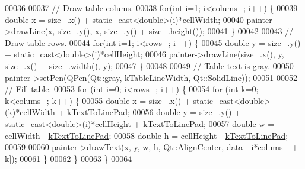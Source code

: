 \begin{DoxyCode}
00036 
00037   \textcolor{comment}{// Draw table colums.}
00038   \textcolor{keywordflow}{for}(\textcolor{keywordtype}{int} i=1; i<colums\_; i++) \{
00039     \textcolor{keywordtype}{double} x = size\_.x() + \textcolor{keyword}{static\_cast<}\textcolor{keywordtype}{double}\textcolor{keyword}{>}(i)*cellWidth;
00040     painter->drawLine(x, size\_.y(), x, size\_.y() + size\_.height());
00041   \}
00042 
00043   \textcolor{comment}{// Draw table rows.}
00044   \textcolor{keywordflow}{for}(\textcolor{keywordtype}{int} i=1; i<rows\_; i++) \{
00045     \textcolor{keywordtype}{double} y = size\_.y() + \textcolor{keyword}{static\_cast<}\textcolor{keywordtype}{double}\textcolor{keyword}{>}(i)*cellHeight;
00046     painter->drawLine(size\_.x(), y, size\_.x() + size\_.width(), y);
00047   \}
00048 
00049   \textcolor{comment}{// Table text is gray.}
00050   painter->setPen(QPen(Qt::gray, \hyperlink{class_data_table_aa4aed4c624ca9a8e68c9ecc4d2b43458}{kTableLineWidth}, Qt::SolidLine));
00051 
00052   \textcolor{comment}{// Fill table.}
00053   \textcolor{keywordflow}{for} (\textcolor{keywordtype}{int} i=0; i<rows\_; i++) \{
00054     \textcolor{keywordflow}{for} (\textcolor{keywordtype}{int} k=0; k<colums\_; k++) \{
00055       \textcolor{keywordtype}{double} x = size\_.x() + \textcolor{keyword}{static\_cast<}\textcolor{keywordtype}{double}\textcolor{keyword}{>}(k)*cellWidth + \hyperlink{class_data_table_ab0703eeee2cf6e45fc74356432434ac6}{kTextToLinePad};
00056       \textcolor{keywordtype}{double} y = size\_.y() + \textcolor{keyword}{static\_cast<}\textcolor{keywordtype}{double}\textcolor{keyword}{>}(i)*cellHeight + \hyperlink{class_data_table_ab0703eeee2cf6e45fc74356432434ac6}{kTextToLinePad};
00057       \textcolor{keywordtype}{double} w = cellWidth - \hyperlink{class_data_table_ab0703eeee2cf6e45fc74356432434ac6}{kTextToLinePad};
00058       \textcolor{keywordtype}{double} h = cellHeight - \hyperlink{class_data_table_ab0703eeee2cf6e45fc74356432434ac6}{kTextToLinePad};
00059 
00060       painter->drawText(x, y, w, h, Qt::AlignCenter, data\_[i*colums\_ + k]);
00061     \}
00062   \}
00063 \}
00064 
\end{DoxyCode}
